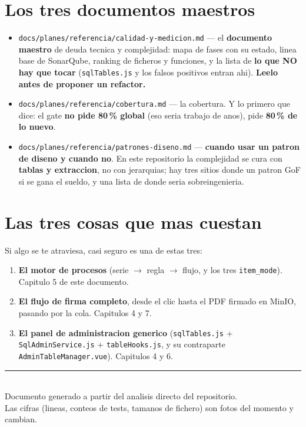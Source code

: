 \documentclass[11pt,a4paper,oneside]{report}
\newcommand{\rt}[1]{\texttt{#1}}
\begin{document}
\section{Los tres documentos maestros}

\begin{itemize}[leftmargin=1.4em]
  \item \rt{docs/planes/referencia/calidad-y-medicion.md} --- el \textbf{documento maestro} de
        deuda tecnica y complejidad: mapa de fases con su estado, linea base de SonarQube,
        ranking de ficheros y funciones, y la lista de \textbf{lo que NO hay que tocar}
        (\rt{sqlTables.js} y los falsos positivos entran ahi). \textbf{Leelo antes de proponer un
        refactor.}
  \item \rt{docs/planes/referencia/cobertura.md} --- la cobertura. Y lo primero que dice: el gate
        \textbf{no pide 80\,\% global} (eso seria trabajo de anos), pide \textbf{80\,\% de lo
        nuevo}.
  \item \rt{docs/planes/referencia/patrones-diseno.md} --- \textbf{cuando usar un patron de
        diseno y cuando no}. En este repositorio la complejidad se cura con \textbf{tablas y
        extraccion}, no con jerarquias; hay tres sitios donde un patron GoF si se gana el sueldo,
        y una lista de donde seria sobreingenieria.
\end{itemize}

\section{Las tres cosas que mas cuestan}

Si algo se te atraviesa, casi seguro es una de estas tres:

\begin{enumerate}[leftmargin=1.6em]
  \item \textbf{El motor de procesos} (serie $\rightarrow$ regla $\rightarrow$ flujo, y los tres
        \rt{item\_mode}). Capitulo 5 de este documento.
  \item \textbf{El flujo de firma completo}, desde el clic hasta el PDF firmado en MinIO, pasando
        por la cola. Capitulos 4 y 7.
  \item \textbf{El panel de administracion generico} (\rt{sqlTables.js} +
        \rt{SqlAdminService.js} + \rt{tableHooks.js}, y su contraparte
        \rt{AdminTableManager.vue}). Capitulos 4 y 6.
\end{enumerate}

\vfill
\begin{center}
\rule{0.4\textwidth}{0.4pt}\\[6pt]
\small Documento generado a partir del analisis directo del repositorio.\\
Las cifras (lineas, conteos de tests, tamanos de fichero) son fotos del momento y cambian.
\end{center}
\end{document}
